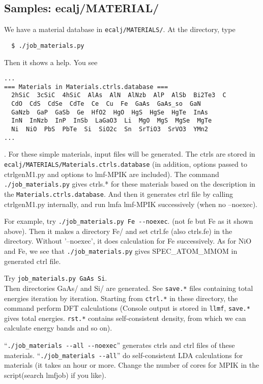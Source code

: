 \documentclass[a4paper,10pt,epsf,fleqn]{article}
\begin{document}
\subsection{Samples: ecalj/MATERIAL/}
We have a material database in \verb+ecalj/MATERIALS/+.
At the directory, type  
\begin{verbatim}
  $ ./job_materials.py
\end{verbatim}
Then it shows a help. You see 
\begin{verbatim}
...
=== Materials in Materials.ctrls.database ===
  2hSiC  3cSiC  4hSiC  AlAs  AlN  AlNzb  AlP  AlSb  Bi2Te3  C
  CdO  CdS  CdSe  CdTe  Ce  Cu  Fe  GaAs  GaAs_so  GaN
  GaNzb  GaP  GaSb  Ge  HfO2  HgO  HgS  HgSe  HgTe  InAs
  InN  InNzb  InP  InSb  LaGaO3  Li  MgO  MgS  MgSe  MgTe
  Ni  NiO  PbS  PbTe  Si  SiO2c  Sn  SrTiO3  SrVO3  YMn2
...
\end{verbatim}
. For these simple materials, input files will be generated.
The ctrls are stored in \verb+ecalj/MATERIALS/Materials.ctrls.database+
(in addition, options passed to ctrlgenM1.py and options to lmf-MPIK are included).
The command \verb+./job_materials.py+ gives ctrls.* for these materials
based on the description in the \verb+Materials.ctrls.database+.
And then it generates ctrl file by calling ctrlgenM1.py internally, 
and run lmfa lmf-MPIK successively (when no --noexec).

For example, try
\verb+./job_materials.py Fe --noexec+. (not fe but Fe as it shown above).
Then it makes a directory Fe/ and set ctrl.fe (also ctrls.fe) in the
directory. Without '--noexec', it does calculation for Fe successively.
As for NiO and Fe, we see that \verb+./job_materials.py+ gives
SPEC\_ATOM\_MMOM in generated ctrl file.

Try \verb+job_materials.py GaAs Si+.\\
Then directories GaAs/ and Si/ are generated. See \verb+save.*+ files containing
total energies iteration by iteration. Starting from \verb+ctrl.*+ in
these directory, the command perform DFT calculations 
(Console output is stored in \verb+llmf+, \verb+save.*+ gives
total energies. \verb+rst.*+ contains self-consistent
density, from which we can calculate energy bands and so on).

``\verb+./job_materials --all --noexec+'' generates ctrls and ctrl files of
these materials. ``\verb+./job_materials --all+'' do self-consistent
LDA calculations for materials (it takes an hour or more. Change the
number of cores for MPIK in the script(search lmfjob) if you like).\\
\end{document}
